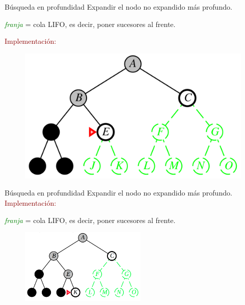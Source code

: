 \documentclass{beamer}
\theoremstyle{definition}
\theoremstyle{theorem}
\theoremstyle{remark}
\begin{document}
\begin{frame}{Búsqueda en profundidad}
    Expandir el nodo no expandido más profundo.\\
    \begin{center}
        \textit{\textcolor{Green}{franja}} = cola LIFO, es decir, poner sucesores al
        frente.\\
    \end{center}{}
    
    \textcolor{DarkRed}{Implementación:}
    \begin{figure}
        \includegraphics[scale=0.2]{48_chap3_pag48.png}
    \end{figure}
\end{frame}{}


\begin{frame}{Búsqueda en profundidad}
    Expandir el nodo no expandido más profundo.\\
    \textcolor{DarkRed}{Implementación:}
    \begin{center}
        \textit{\textcolor{Green}{franja}} = cola LIFO, es decir, poner sucesores al
        frente.\\
    \end{center}
    \begin{figure}
        \centering
        \includegraphics[width = 60mm, scale = 0.7]{50_chap3_pag50.PNG}
    \end{figure}
\end{frame}
\end{document}
